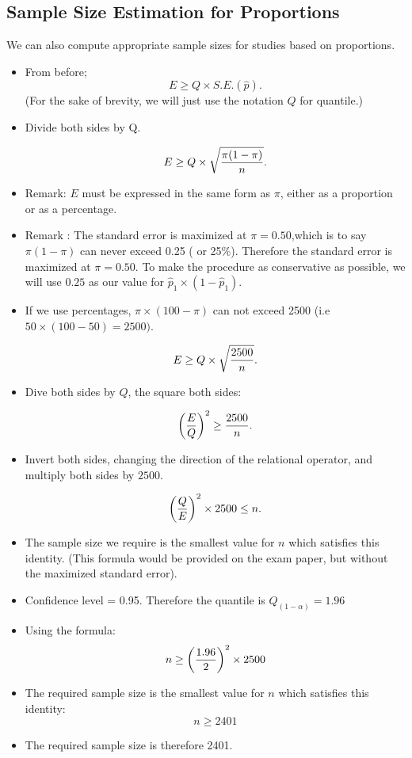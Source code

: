 \documentclass[]{report}
\begin{document}
\subsection{Sample Size Estimation for Proportions}
We can also compute appropriate sample sizes for studies based on proportions.
\begin{itemize}
\item From before; \[ E \geq Q \times S.E.(\hat{p}). \]
(For the sake of brevity, we will just use the notation $Q$ for quantile.)

\item Divide both sides by Q.

\[ E \geq Q \times \sqrt{ {\pi(1-\pi)  \over n} }. \]


\item Remark: $E$ must be expressed in the same form as $\pi$, either as a proportion or as a percentage.
\item Remark : The standard error is maximized at $\pi = 0.50$,which is to say $\pi(1-\pi)$ can never exceed 0.25 ( or 25\%). Therefore the standard error is maximized at $\pi = 0.50$. To make the procedure as conservative as possible, we will use $0.25$ as our value for $\hat{p}_1 \times (1 - \hat{p}_1)$.
\item If we use percentages, $\pi \times (100-\pi)$ can not exceed 2500 (i.e $ 50 \times (100-50)=2500)$.

\[ E \geq Q \times \sqrt{{2500 \over n}}. \]




\item Dive both sides by $Q$, the square both sides:

\[ \left({E\over Q}\right)^2 \geq {2500 \over n}. \]

\item Invert both sides, changing the direction of the relational operator, and multiply both sides by $2500$.

\[ \left({Q\over E}\right)^2 \times 2500 \leq n. \]

\item The sample size we require is the smallest value for $n$ which satisfies this identity. (This formula would be provided on the exam paper, but without the maximized standard error).

\item Confidence level = 0.95. Therefore the quantile is $Q_{(1-\alpha)} = 1.96$
\item Using the formula: \[ n \geq \left({1.96 \over 2 }\right)^2 \times 2500  \]
\item The required sample size is the smallest value for $n$ which satisfies this identity: \[ n \geq 2401  \]
\item The required sample size is therefore 2401.
\end{itemize}
\end{document}

